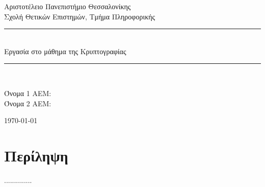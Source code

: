\documentclass[12pt]{article}
\newcommand\blankpage{%
    \null
    \thispagestyle{empty}%
    \addtocounter{page}{-1}%
    \newpage}
\newcommand{\HRule}{\rule{\linewidth}{0.5mm}}
\begin{document}
\begin{titlepage}
\begin{center}

{\LARGE Αριστοτέλειο Πανεπιστήμιο Θεσσαλονίκης\\}
{\Large Σχολή Θετικών Επιστημών, Τμήμα Πληροφορικής  \\}

\begin{figure}[h]
\centering 
\end{figure}
\begin{center}

\HRule \\[0.4cm]
{\huge Εργασία στο μάθημα της Κρυπτογραφίας}

\HRule \\[0.4cm]
\end{center}

\vfill
\begin{doublespacing}

{\LARGE 
Όνομα 1 ΑΕΜ: \\}
{\LARGE 
Όνομα 2 ΑΕΜ: \\}


\vfill 
{\Large \today}
\end{doublespacing}
\end{center}
\end{titlepage}


\tableofcontents

\clearpage


\section*{{\color{maroon}Περίληψη}}

..............
\blankpage



\end{document}
